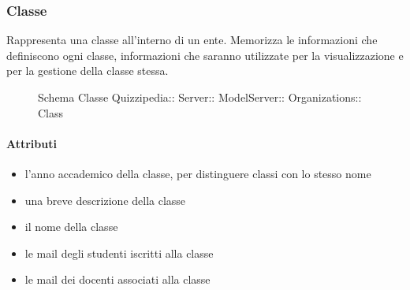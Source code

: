 \subsubsection{Classe }
Rappresenta una classe all'interno di un ente. Memorizza le informazioni che definiscono ogni classe,
informazioni che saranno utilizzate per la visualizzazione e per la gestione della classe stessa.
\begin{figure}[H]
\centering
\noindent{}
\caption[Schema Classe Class]{Schema Classe Quizzipedia:: Server:: ModelServer:: Organizations:: Class}
\end{figure}
\paragraph{Attributi}
\begin{itemize}
\item {}
\newline
l'anno accademico della classe, per distinguere classi con lo stesso nome
\item {}
\newline
una breve descrizione della classe
\item {}
\newline
il nome della classe
\item {}
\newline
le mail degli studenti iscritti alla classe
\item {}
\newline
le mail dei docenti associati alla classe
\end{itemize}
